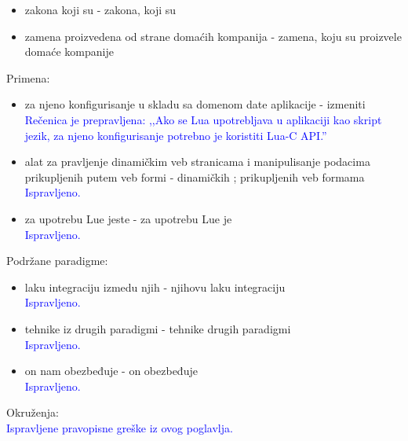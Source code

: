 \documentclass[a4paper]{report}
\newcommand{\odgovorAutora}[1]{\textcolor{blue}{#1}}
\newcommand{\note}[1]{\textcolor{red}{#1}}
\begin{document}
\begin{itemize}
  \item zakona koji su - zakona, koji su
  \item zamena proizvedena od strane domaćih kompanija - zamena, koju su proizvele domaće kompanije
\end{itemize}
Primena:  
\begin{itemize}
  \item za njeno konfigurisanje u skladu sa domenom date aplikacije - izmeniti
  \odgovorAutora{Rečenica je prepravljena: ,,Ako se Lua upotrebljava u aplikaciji kao skript jezik, za njeno konfigurisanje potrebno je koristiti Lua-C API.''}
  \item alat za pravljenje dinamičkim veb stranicama i manipulisanje podacima prikupljenih putem veb formi - dinamičkih ; prikupljenih veb formama
  \odgovorAutora{Ispravljeno.}
  \item  za upotrebu Lue jeste - za upotrebu Lue je\\
  \odgovorAutora{Ispravljeno.}
\end{itemize}
Podržane paradigme:
\begin{itemize}
  \item laku integraciju izmedu njih - njihovu laku integraciju \\
  \odgovorAutora{Ispravljeno.}
  \item tehnike iz drugih paradigmi - tehnike drugih paradigmi \\
  \odgovorAutora{Ispravljeno.}
  \item on nam obezbeđuje - on obezbeđuje \\
  \odgovorAutora{Ispravljeno.}
\end{itemize}
Okruženja: \\
\odgovorAutora{Ispravljene pravopisne greške iz ovog poglavlja.}
\end{document}
